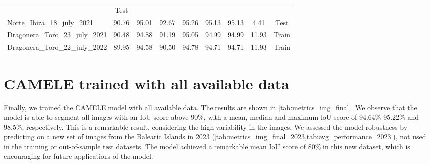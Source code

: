 \begin{table}[H]
{\begin{tabular}{lcccccccc}
                                                   & {\color[HTML]{fc8d62}
                    Test}
            \\
            Norte\_Ibiza\_18\_july\_2021           & 90.76
                                                   & 95.01
                                                   & 92.67
                                                   & 95.26
                                                   & 95.13
                                                   & 95.13
                                                   & 4.41
                                                   & {\color[HTML]{fc8d62}
                    Test}
            \\
            Dragonera\_Toro\_23\_july\_2021        & 90.48
                                                   & 94.88
                                                   & 91.19
                                                   & 95.05
                                                   & 94.99
                                                   & 94.99
                                                   & 11.93
                                                   & {\color[HTML]{66c2a5}
                    Train}
            \\
            Dragonera\_Toro\_22\_july\_2022        & 89.95
                                                   & 94.58
                                                   & 90.50
                                                   & 94.78
                                                   & 94.71
                                                   & 94.71
                                                   & 11.93
                                                   & {\color[HTML]{66c2a5}
            Train}                                                         \\
            \bottomrule
        \end{tabular}%
    }
\end{table}

\section{CAMELE trained with all available data}\label{app:final_model}

Finally, we trained the CAMELE model with all available data. The results are
shown in \cref{tab:metrics_img_final}.
We observe that the model is able to segment all images with an IoU score above
$90\%$, with a mean, median and maximum IoU score of 94.64\% 95.22\% and
98.5\%, respectively. This is a remarkable result, considering the high
variability in the images. We assessed the model
robustness by predicting on a new set of images from the Balearic Islands in
2023 (\cref{tab:metrics_img_final_2023,tab:avg_performance_2023}), not used in
the training or out-of-sample test datasets. The model achieved a remarkable
mean IoU score of 80\% in this new dataset, which is encouraging for future
applications of the model.

